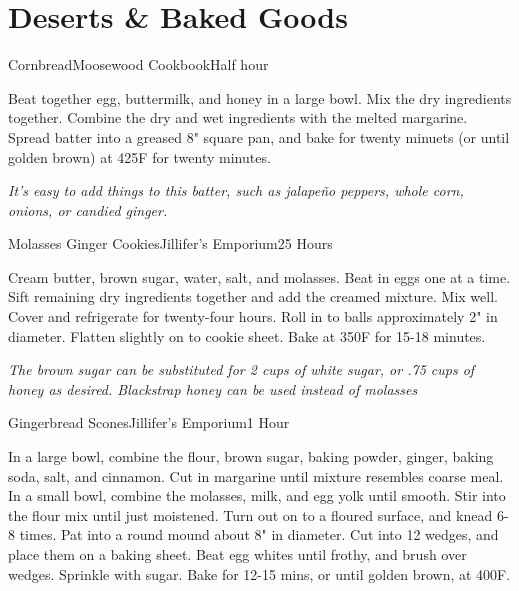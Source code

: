 \documentclass{book}
\begin{document}
\chapter{Deserts \& Baked Goods}
\begin{recipe}{Cornbread}{Moosewood Cookbook}{Half hour}

  Beat together egg, buttermilk, and honey in a large bowl. Mix the
  dry ingredients together. Combine the dry and wet ingredients with
  the melted margarine. Spread batter into a greased 8" square pan,
  and bake for twenty minuets (or until golden brown) at 425\0F for
  twenty minutes.
\end{recipe}
\textit{ It's easy to add things to this batter, such as jalape\~no
  peppers, whole corn, onions, or candied ginger.}

\begin{recipe}{Molasses Ginger Cookies}{Jillifer's Emporium}{25 Hours}

  Cream butter, brown sugar, water, salt, and molasses. Beat in eggs one at a
  time. Sift remaining dry ingredients together and add the creamed
  mixture. Mix well. Cover and refrigerate for twenty-four hours. Roll in to
  balls approximately 2" in diameter. Flatten slightly on to cookie
  sheet. Bake at 350\0F for 15-18 minutes.
\end{recipe}
\textit{The brown sugar can be substituted for 2 cups of white sugar, or .75
  cups of honey as desired. Blackstrap honey can be used instead of molasses}

\begin{recipe}{Gingerbread Scones}{Jillifer's Emporium}{1 Hour}

  In a large bowl, combine the flour, brown sugar, baking powder,
  ginger, baking soda, salt, and cinnamon. Cut in margarine until
  mixture resembles coarse meal. In a small bowl, combine the
  molasses, milk, and egg yolk until smooth. Stir into the flour mix
  until just moistened. Turn out on to a floured surface, and knead
  6-8 times. Pat into a round mound about 8" in diameter. Cut into 12
  wedges, and place them on a baking sheet. Beat egg whites until
  frothy, and brush over wedges. Sprinkle with sugar. Bake for 12-15
  mins, or until golden brown, at 400\0F.
\end{recipe}
\end{document}
